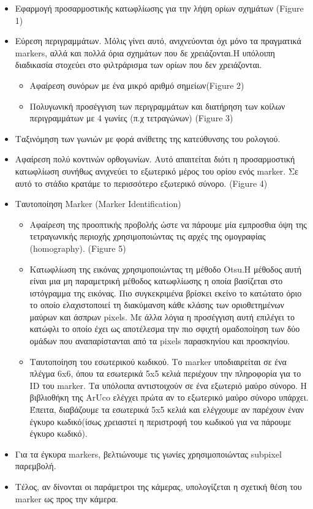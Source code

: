 \begin{itemize}
\item Εφαρμογή προσαρμοστικής κατωφλίωσης για την λήψη ορίων σχημάτων (Figure 1)
\item Εύρεση περιγραμμάτων. Μόλις γίνει αυτό, ανιχνεύονται όχι μόνο τα πραγματικά markers, αλλά και πολλά όρια σχημάτων που δε χρειάζονται.Η υπόλοιπη διαδικασία στοχεύει στο φιλτράρισμα των ορίων που δεν χρειάζονται.
\begin{itemize}
\item Αφαίρεση συνόρων με ένα μικρό αριθμό σημείων(Figure 2)
\item Πολυγωνική προσέγγιση των περιγραμμάτων και διατήρηση των κοίλων περιγραμμάτων με 4 γωνίες (π.χ τετραγώνων) (Figure 3)
\end{itemize}
\item Ταξινόμηση των γωνιών με φορά ανίθετης της κατεύθυνσης του ρολογιού.
\item Αφαίρεση πολύ κοντινών ορθογωνίων. Αυτό απαιτείται διότι η προσαρμοστική κατωφλίωση συνήθως ανιχνεύει το εξωτερικό μέρος του ορίου ενός marker. Σε αυτό το στάδιο κρατάμε το περισσότερο εξωτερικό σύνορο. (Figure 4)
\item Ταυτοποίηση Marker (Marker Identification)
\begin{itemize}
\item Αφαίρεση της προοπτικής προβολής ώστε να πάρουμε μία εμπροσθια όψη της τετραγωνικής περιοχής χρησιμοποιώντας τις αρχές της ομογραφίας (homography). (Figure 5)
\item Κατωφλίωση της εικόνας χρησιμοποιώντας τη μέθοδο Otsu.Η μέθοδος αυτή είναι μια μη παραμετρική μέθοδος κατωφλίωσης η οποία βασίζεται στο ιστόγραμμα της εικόνας. Πιο συγκεκριμένα βρίσκει εκείνο το κατώτατο όριο το οποίο ελαχιστοποιεί τη διακύμανση κάθε κλάσης των οριοθετημένων μαύρων και άσπρων pixels. Με άλλα λόγια η προσέγγιση αυτή επιλέγει το κατώφλι το οποίο έχει ως αποτέλεσμα την πιο σφιχτή ομαδοποίηση των δύο ομάδων που αναπαρίστανται από τα pixels παρασκηνίου και προσκηνίου. 
\item Ταυτοποίηση του εσωτερικού κωδικού. Το marker υποδιαιρείται σε ένα πλέγμα 6x6, όπου τα εσωτερικά 5x5 κελιά περιέχουν την πληροφορία για το ID του marker. Τα υπόλοιπα αντιστοιχούν σε ένα εξωτεριό μαύρο σύνορο. Η βιβλιοθήκη της ArUco ελέγχει πρώτα αν το εξωτερικό μαύρο σύνορο υπάρχει. Έπειτα, διαβάζουμε τα εσωτερικά 5x5 κελιά και ελέγχουμε αν παρέχουν έναν έγκυρο κωδικό(ίσως χρειαστεί η περιστροφή του κωδικού για να πάρουμε έγκυρο κωδικό). 
\end{itemize}
\item Για τα έγκυρα markers, βελτιώνουμε τις γωνίες χρησιμοποιώντας subpixel  παρεμβολή.
\item Τέλος, αν δίνονται οι παράμετροι της κάμερας, υπολογίζεται η σχετική θέση του marker ως προς την κάμερα.
\end{itemize}



